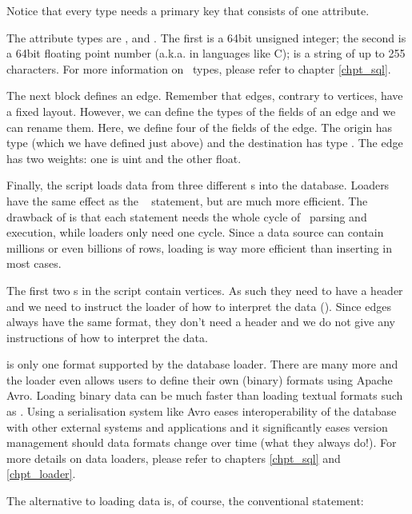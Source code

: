 Notice that every type needs a primary key that consists
of one attribute.

The attribute types are ,  and .
The first is a 64bit unsigned integer;
the second is a 64bit floating point number
(a.k.a.  in languages like C);
 is a string of up to 255  characters.
For more information on \sql\ types, please refer to chapter
\ref{chpt_sql}.

The next block defines an edge. Remember
that edges, contrary to vertices, have a fixed layout.
However, we can define the types of the fields of an edge
and we can rename them. 
Here, we define four of the fields of the edge.
The origin has type  (which we have defined just above)
and the destination has type .
The edge has two weights: one is uint and the other float.

Finally, the script loads data from three different s
into the database. Loaders have the same effect as the \sql\
 statement, but are much more efficient.
The drawback of \term{insert} is that each statement
needs the whole cycle of \sql\ parsing and execution,
while loaders only need one cycle. Since a data source
can contain millions or even billions of rows,
loading is way more efficient than inserting in most cases.

The first two s in the script contain vertices.
As such they need to have a header and we need to instruct
the loader of how to interpret the data ().
Since edges always have the same format, they don't need a header
and we do not give any instructions of how to interpret the data.

 is only one format supported by the database loader.
There are many more and the loader even allows users to define
their own (binary) formats using Apache Avro. Loading binary data 
can be much faster than loading textual formats such as .
Using a serialisation system like Avro eases
interoperability of the database with other
external systems and applications and it
significantly eases version management should data formats
change over time (what they always do!). 
For more details on data loaders, please refer to chapters
\ref{chpt_sql} and \ref{chpt_loader}.

The alternative to loading data is, of course, the conventional
 statement:


